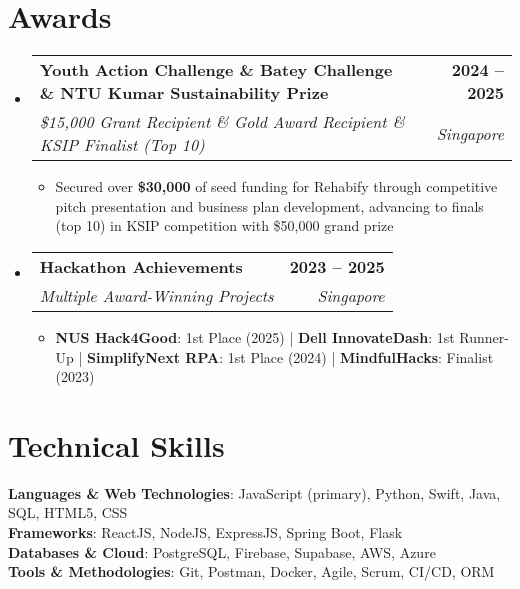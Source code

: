 \documentclass[letterpaper,11pt]{article}
\makeatletter
\newcommand{\resumeItem}[1]{
  \item\small{#1}
}
\newcommand{\resumeSubheading}[4]{
  \vspace{-2pt}\item
    \begin{tabular*}{1.0\textwidth}[t]{l@{\extracolsep{\fill}}r}
      \textbf{#1} & \textbf{\small #2} \\
      \textit{\small#3} & \textit{\small #4} \\
    \end{tabular*}\vspace{-7pt}
}
\newcommand{\resumeSubHeadingListStart}{\begin{itemize}[leftmargin=0.0in, label={}]}
\newcommand{\resumeSubHeadingListEnd}{\end{itemize}}
\newcommand{\resumeItemListStart}{\begin{itemize}}
\newcommand{\resumeItemListEnd}{\end{itemize}\vspace{-5pt}}
\makeatother
\begin{document}
\section{Awards}
    \resumeSubHeadingListStart
        \resumeSubheading
            {Youth Action Challenge \& Batey Challenge \& NTU Kumar Sustainability Prize}{2024 -- 2025}
            {\$15,000 Grant Recipient \& Gold Award Recipient \& KSIP Finalist (Top 10)}{Singapore}
            \resumeItemListStart
                \resumeItem{Secured over \textbf{\$30,000} of seed funding for Rehabify through competitive pitch presentation and business plan development, advancing to finals (top 10) in KSIP competition with \$50,000 grand prize}
            \resumeItemListEnd
            
        \resumeSubheading
            {Hackathon Achievements}{2023 -- 2025}
            {Multiple Award-Winning Projects}{Singapore}
            \resumeItemListStart
                \resumeItem{\textbf{NUS Hack4Good}: 1st Place (2025) |
                \textbf{Dell InnovateDash}: 1st Runner-Up |
                \textbf{SimplifyNext RPA}: 1st Place (2024) | \textbf{MindfulHacks}: Finalist (2023)}
            \resumeItemListEnd
    \resumeSubHeadingListEnd
\vspace{-16pt}

\section{Technical Skills}
 \begin{itemize}[leftmargin=0.15in, label={}]
    \small{\item{   
     \textbf{Languages \& Web Technologies}{: JavaScript (primary), Python, Swift, Java, SQL, HTML5, CSS} \\[1mm]
     \textbf{Frameworks}{: ReactJS, NodeJS, ExpressJS, Spring Boot, Flask} \\[1mm]
     \textbf{Databases \& Cloud}{: PostgreSQL, Firebase, Supabase, AWS, Azure} \\[1mm]
     \textbf{Tools \& Methodologies}{: Git, Postman, Docker, Agile, Scrum, CI/CD, ORM} \\
    }}
 \end{itemize}

\end{document}
